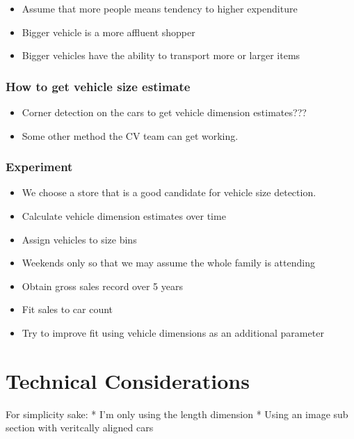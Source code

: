 \documentclass{article}
\begin{document}
\begin{itemize}
\itemsep1pt\parskip0pt
\item
  Assume that more people means tendency to higher expenditure
\item
  Bigger vehicle is a more affluent shopper
\item
  Bigger vehicles have the ability to transport more or larger items
\end{itemize}

\subsubsection{How to get vehicle size
estimate}\label{how-to-get-vehicle-size-estimate}

\begin{itemize}
\itemsep1pt\parskip0pt
\item
  Corner detection on the cars to get vehicle dimension estimates???
\item
  Some other method the CV team can get working.
\end{itemize}

\subsubsection{Experiment}\label{experiment}

\begin{itemize}
\itemsep1pt\parskip0pt
\item
  We choose a store that is a good candidate for vehicle size detection.
\item
  Calculate vehicle dimension estimates over time
\item
  Assign vehicles to size bins
\item
  Weekends only so that we may assume the whole family is attending
\item
  Obtain gross sales record over 5 years
\item
  Fit sales to car count
\item
  Try to improve fit using vehicle dimensions as an additional parameter
\end{itemize}

    \section{Technical Considerations}\label{technical-considerations}

For simplicity sake: * I'm only using the length dimension * Using an
image sub section with veritcally aligned cars
\end{document}
